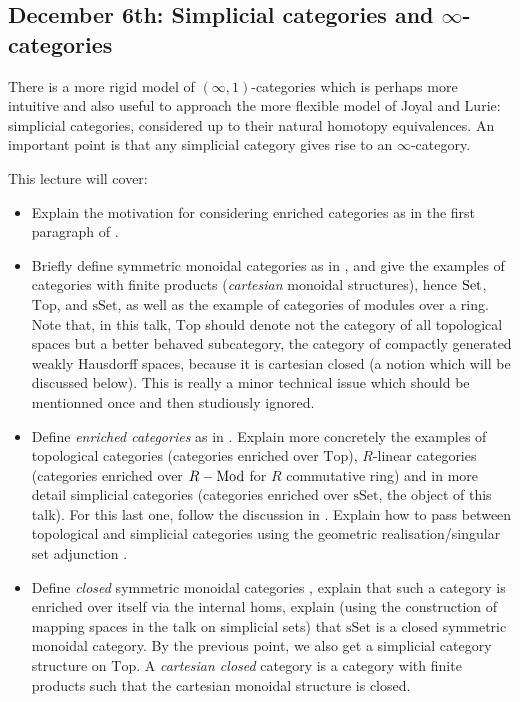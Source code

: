 \documentclass{amsart}
\theoremstyle{definition}
\theoremstyle{remark}
\newcommand{\Mod}{\rm Mod}
\newcommand{\Set}{\mathop{\rm Set}\nolimits}
\newcommand{\Top}{\mathrm{Top}}
\newcommand{\sSet}{\mathrm{sSet}}
\begin{document}
\subsection{December 6th: Simplicial categories and $\infty$-categories}

There is a more rigid model of $(\infty,1)$-categories which is perhaps more intuitive and also useful to approach the more flexible model of Joyal and Lurie: simplicial categories, considered up to their natural homotopy equivalences. An important point is that any simplicial category gives rise to an $\infty$-category.

This lecture will cover:

\begin{itemize}
\item Explain the motivation for considering enriched categories as in the first paragraph of \cite[Chapter 3]{Riehl_cat_hom}.
\item Briefly define symmetric monoidal categories as in \cite[\S 3.1]{Riehl_cat_hom}, and give the examples of categories with finite products (\emph{cartesian} monoidal structures), hence $\Set$, $\Top$, and $\sSet$, as well as the example of categories of modules over a ring. Note that, in this talk, $\Top$ should denote not the category of all topological spaces but a better behaved subcategory, the category of compactly generated weakly Hausdorff spaces, because it is cartesian closed (a notion which will be discussed below). This is really a minor technical issue which should be mentionned once and then studiously ignored.
\item Define \emph{enriched categories} as in \cite[Def. 3.3.1]{Riehl_cat_hom}. Explain more concretely the examples of topological categories (categories enriched over $\Top$), $R$-linear categories (categories enriched over $R-\Mod$ for $R$ commutative ring) and in more detail simplicial categories (categories enriched over $\sSet$, the object of this talk). For this last one, follow the discussion in \cite[\S 3.6]{Riehl_cat_hom}. Explain how to pass between topological and simplicial categories using the geometric realisation/singular set adjunction \cite[end of p.18-top of p.19]{HTT}.
\item Define \emph{closed} symmetric monoidal categories \cite[Def. 3.3.6]{Riehl_cat_hom}, explain that such a category is enriched over itself via the internal homs, explain (using the construction of mapping spaces in the talk on simplicial sets) that $\sSet$ is a closed symmetric monoidal category. By the previous point, we also get a simplicial category structure on $\Top$. A \emph{cartesian closed} category is a category with finite products such that the cartesian monoidal structure is closed.

\end{itemize}
\end{document}
